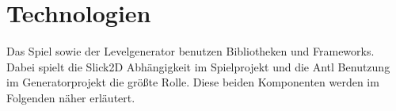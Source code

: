 \section{Technologien}

Das Spiel sowie der Levelgenerator benutzen Bibliotheken und Frameworks. Dabei spielt die Slick2D Abhängigkeit im Spielprojekt und die Antl Benutzung im Generatorprojekt die größte Rolle. Diese beiden Komponenten werden im Folgenden näher erläutert.


